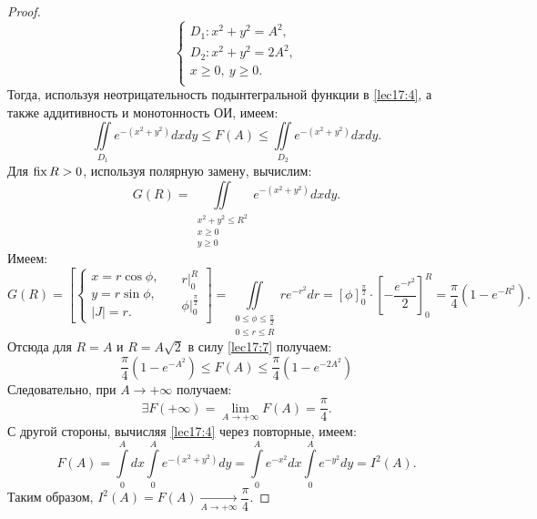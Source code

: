 \documentclass[../../main.tex]{subfiles}
\begin{document}
\begin{proof}
     \begin{equation}
		 	\label{lec17:6}
            \begin{cases}
                D_1 : x^2 + y^2 = A^2,\\
                D_2 : x^2 + y^2 = 2A^2,\\
                x \geq 0,\ y \geq 0.\\
            \end{cases}
		\end{equation}
  Тогда, используя неотрицательность подынтегральной 
  функции в \eqref{lec17:4}, а также аддитивность и монотонность ОИ, имеем:
	\begin{equation}
		\label{lec17:7}
		\iint\limits_{D_1}e^{-(x^2 + y^2)}dxdy \leq F(A) \leq
		\iint\limits_{D_2}e^{-(x^2 + y^2)}dxdy.
	\end{equation}
    Для $\operatorname{fix} R > 0$, используя полярную замену, вычислим:
	\begin{equation}
        \label{lec17:8}
		G(R) = \iint\limits_{\substack{
		x^2 + y^2 \leq R^2 \\
		x \geq 0 \\
		y \geq 0
		}}e^{-(x^2 + y^2)}dxdy.
	\end{equation}
	Имеем:
    \begin{equation*}
        G(R) =
        \left[
		\left\{
        \begin{gathered} 
        x = r \cos \phi,\\
        y = r \sin \phi,\\
        |J| = r.
        \end{gathered}
        \right. \quad
        \begin{gathered}
        r\vert_0^R\\
		\phi \vert_0^{\frac{\pi}{2}}\\
        \end{gathered}
        \right]
        = \iint\limits_{\substack{0\leq\phi\leq \frac{\pi}{2}\\
				0 \leq r \leq R}}r e^{-r^2}dr =
        \left[ \phi \right]_0^{\frac{\pi}{2}} \cdot
        \left[ -\frac{e^{-r^2}}{2} \right]_0^{R} =
        \frac{\pi}{4}(1 - e^{-R^2}).
	\end{equation*}
	Отсюда для $R = A$ и $R = A\sqrt{2}$ в силу \eqref{lec17:7} получаем:
	\begin{equation}
	 \frac{\pi}{4}(1 - e^{-A^2}) \leq F(A) \leq
	 \frac{\pi}{4}(1 - e^{-2A^2})
	\end{equation}
    Следовательно, при $A \to +\infty$ получаем:
    \begin{equation}
    \exists F(+\infty)=\lim\limits_{A\to+\infty}F(A) = \frac{\pi}{4}.
    \end{equation}
    С другой стороны, вычисляя \eqref{lec17:4} через повторные, имеем:
    \begin{equation*}
     F(A)= \int\limits_0^{A}dx\int\limits_0^{A}e^{-(x^2+y^2)}dy = 
     \int\limits_0^{A}e^{-x^2}dx \int\limits_0^{A}e^{-y^2}dy = I^2(A).
    \end{equation*}
    Таким образом, $I^2(A) =
    F(A) \xrightarrow[A\to +\infty]{} \dfrac{\pi}{4}$.
    

\end{proof}
\end{document}
